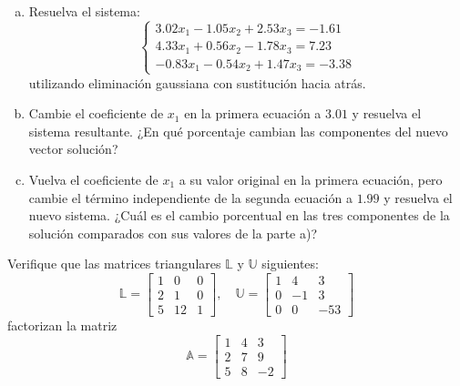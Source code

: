\documentclass[11pt]{article}
\begin{document}
\begin{question} %
\begin{enumerate}[a)]
\item Resuelva el sistema:
    \[ \begin{cases}
        3.02 x_1 - 1.05 x_2 + 2.53 x_3 = -1.61 \\
        4.33 x_1 + 0.56 x_2 - 1.78 x_3 = 7.23 \\
        -0.83 x_1 - 0.54 x_2 + 1.47 x_3 = -3.38
    \end{cases} \]
    utilizando eliminación gaussiana con sustitución hacia atrás.
\item Cambie el coeficiente de $x_1$ en la primera ecuación a $3.01$ y resuelva el sistema resultante. ¿En qué porcentaje cambian las componentes del nuevo vector solución?
\item Vuelva el coeficiente de $x_1$ a su valor original en la primera ecuación, pero cambie el término independiente de la segunda ecuación a $1.99$ y resuelva el nuevo sistema. ¿Cuál es el cambio porcentual en las tres componentes de la solución comparados con sus valores de la parte a)?
\end{enumerate}
\end{question}

\begin{question} %
    Verifique que las matrices triangulares $\mathbb{L}$ y $\mathbb{U}$ siguientes:
    \[ \mathbb{L} = \begin{bmatrix} 1 & 0 & 0 \\ 2 & 1 & 0 \\ 5 & 12 & 1 \end{bmatrix}, \quad \mathbb{U} = \begin{bmatrix} 1 & 4 & 3 \\ 0 & -1 & 3 \\ 0 & 0 & -53 \end{bmatrix} \]
    factorizan la matriz
    \[ \mathbb{A} = \begin{bmatrix} 1 & 4 & 3 \\ 2 & 7 & 9 \\ 5 & 8 & -2 \end{bmatrix} \]
\end{question}
\end{document}
